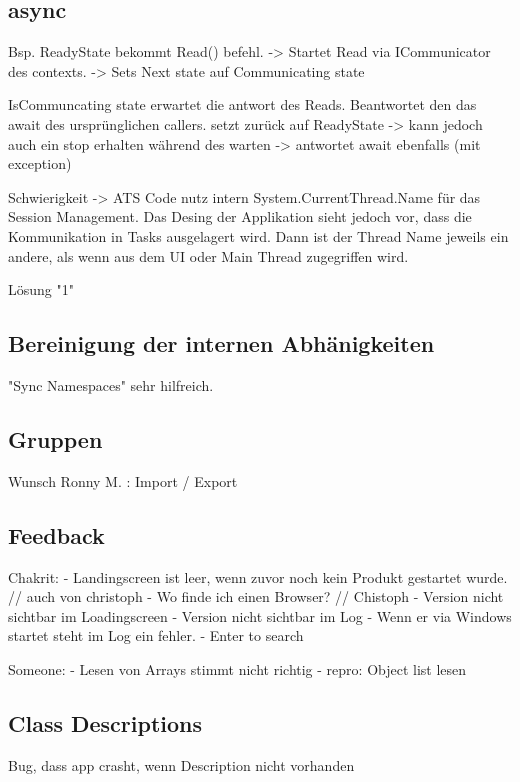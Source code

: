 \subsection{async}
Bsp. ReadyState bekommt Read() befehl.
-> Startet Read via ICommunicator des contexts.
-> Sets Next state auf Communicating state

IsCommuncating state erwartet die antwort des Reads.
Beantwortet den das await des ursprünglichen callers.
setzt zurück auf ReadyState
-> kann jedoch auch ein stop erhalten während des warten
   -> antwortet await ebenfalls (mit exception)

Schwierigkeit -> 
ATS Code nutz intern System.CurrentThread.Name für das Session Management.
Das Desing der Applikation sieht jedoch vor, dass die Kommunikation in Tasks ausgelagert wird.
Dann ist der Thread Name jeweils ein andere, als wenn aus dem UI oder Main Thread zugegriffen wird.

Lösung "1"



\subsection{Bereinigung der internen Abhänigkeiten}
"Sync Namespaces" sehr hilfreich.


\subsection{Gruppen}

Wunsch Ronny M. : Import / Export 


\subsection{Feedback}
Chakrit: 
- Landingscreen ist leer, wenn zuvor noch kein Produkt gestartet wurde. // auch von christoph
   - Wo finde ich einen Browser? // Chistoph
- Version nicht sichtbar im Loadingscreen
- Version nicht sichtbar im Log
- Wenn er via Windows startet steht im Log ein fehler.
- Enter to search

Someone:
- Lesen von Arrays stimmt nicht richtig
   - repro: Object list lesen

\subsection{Class Descriptions}



Bug, dass app crasht, wenn Description nicht vorhanden